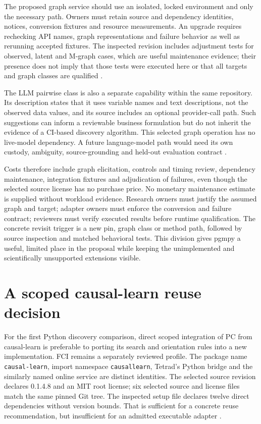 The proposed graph service should use an isolated, locked environment and
only the necessary path. Owners must retain source and dependency identities,
notices, conversion fixtures and resource measurements. An upgrade requires
rechecking API names, graph representations and failure behavior as well as
rerunning accepted fixtures. The inspected revision includes adjustment
tests for observed, latent and M-graph cases, which are useful maintenance
evidence; their presence does not imply that those tests were executed here
or that all targets and graph classes are qualified
\cite{exec13_pgmpy_reuse_primary}.

The LLM pairwise class is also a separate capability within the same
repository. Its description states that it uses variable names and text
descriptions, not the observed data values, and its source includes an
optional provider-call path. Such suggestions can inform a reviewable
business formulation but do not inherit the evidence of a CI-based
discovery algorithm. This selected graph operation has no live-model
dependency. A future language-model path would need its own custody,
ambiguity, source-grounding and held-out evaluation contract
\cite{exec13_pgmpy_reuse_primary}.

Costs therefore include graph elicitation, controls and timing review,
dependency maintenance, integration fixtures and adjudication of failures,
even though the selected source license has no purchase price. No monetary
maintenance estimate is supplied without workload evidence. Research owners
must justify the assumed graph and target; adapter owners must enforce
the conversion and failure contract; reviewers must verify executed
results before runtime qualification. The concrete revisit trigger is
a new pin, graph class or method path, followed by source inspection and
matched behavioral tests. This division gives pgmpy a useful, limited
place in the proposal while keeping the unimplemented and scientifically
unsupported extensions visible.
\label{exec13:pgmpy-reuse-end}


\section{A scoped causal-learn reuse decision}
\label{exec14:causallearn-decision}

For the first Python discovery comparison, direct scoped integration of PC from
causal-learn is preferable to porting its search and orientation rules into a
new implementation. FCI remains a separately reviewed profile. The package name
\texttt{causal-learn}, import namespace \texttt{causallearn}, Tetrad's Python
bridge and the similarly named online service are distinct identities. The
selected source revision declares 0.1.4.8 and an MIT root license; six selected
source and license files match the same pinned Git tree. The inspected setup
file declares twelve direct dependencies without version bounds. That is
sufficient for a concrete reuse recommendation, but insufficient for an admitted
executable adapter \citep{exec14_causallearn_reuse}.

